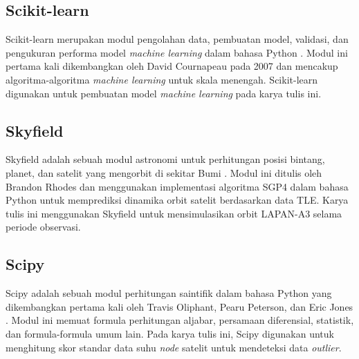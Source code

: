 \subsection{Scikit-learn}

Scikit-learn merupakan modul pengolahan data, pembuatan model, validasi, dan
pengukuran performa model \textit{machine learning} dalam bahasa Python \cite{pedregosa2011}.
Modul ini pertama kali dikembangkan oleh David Cournapeau pada 2007 dan
mencakup algoritma-algoritma \textit{machine learning} untuk skala menengah.
Scikit-learn digunakan untuk pembuatan model \textit{machine learning} pada karya tulis
ini.

\subsection{Skyfield}

Skyfield adalah sebuah modul astronomi untuk perhitungan posisi bintang,
planet, dan satelit yang mengorbit di sekitar Bumi \cite{rhodes2019}. Modul ini
ditulis oleh Brandon Rhodes dan menggunakan implementasi algoritma SGP4 dalam
bahasa Python \cite{rodriguez} untuk memprediksi dinamika orbit satelit berdasarkan
data TLE. Karya tulis ini menggunakan Skyfield untuk
mensimulasikan orbit LAPAN-A3 selama periode observasi.

\subsection{Scipy}

Scipy adalah sebuah modul perhitungan saintifik dalam bahasa Python yang
dikembangkan pertama kali oleh Travis Oliphant, Pearu Peterson, dan Eric Jones
\cite{virtanen2020}. Modul ini memuat formula perhitungan aljabar, persamaan
diferensial, statistik, dan formula-formula umum lain. Pada karya tulis ini,
Scipy digunakan untuk menghitung skor standar data suhu \textit{node} satelit
untuk mendeteksi data \textit{outlier}.
